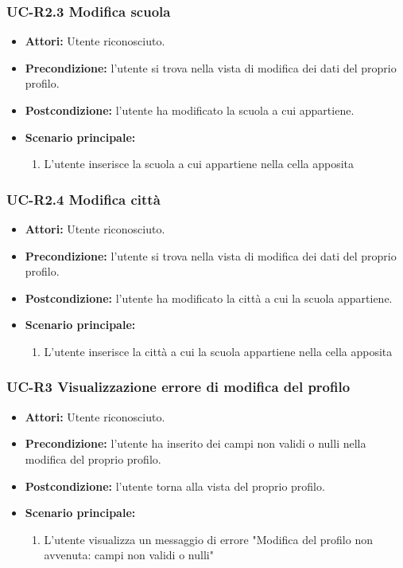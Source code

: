 \subsubsection{UC-R2.3 Modifica scuola}
\begin{itemize}
			\item \textbf{Attori:} Utente riconosciuto.
			\item \textbf{Precondizione:} l'utente si trova nella vista di modifica dei dati del proprio profilo.
			\item \textbf{Postcondizione:} l'utente ha modificato la scuola a cui appartiene.
			\item \textbf{Scenario principale:}
			\begin{enumerate}
				\item L'utente inserisce la scuola a cui appartiene nella cella apposita
			\end{enumerate}
\end{itemize}

\subsubsection{UC-R2.4 Modifica città}
\begin{itemize}
			\item \textbf{Attori:} Utente riconosciuto.
			\item \textbf{Precondizione:} l'utente si trova nella vista di modifica dei dati del proprio profilo.
			\item \textbf{Postcondizione:} l'utente ha modificato la città a cui la scuola appartiene.
			\item \textbf{Scenario principale:}
			\begin{enumerate}
				\item L'utente inserisce la città a cui la scuola appartiene nella cella apposita
			\end{enumerate}
\end{itemize}

\subsubsection{UC-R3 Visualizzazione errore di modifica del profilo}	
	\begin{itemize}
		\item \textbf{Attori:} Utente riconosciuto.
		\item \textbf{Precondizione:} l'utente ha inserito dei campi non validi o nulli nella modifica del proprio profilo.
		\item \textbf{Postcondizione:} l'utente torna alla vista del proprio profilo.
		\item \textbf{Scenario principale:}
		\begin{enumerate}
			\item L'utente visualizza un messaggio di errore "Modifica del profilo non avvenuta: campi non validi o nulli"
		\end{enumerate}
	\end{itemize}

